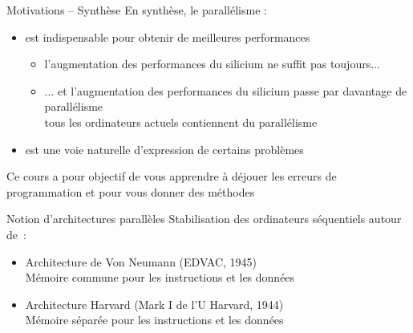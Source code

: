 \begin {frame} {Motivations -- Synthèse}
    En synthèse, le parallélisme :
    \begin {itemize}
	\item est indispensable pour obtenir de meilleures
	    performances

	    \begin {itemize}
		\item l'augmentation des performances du silicium
		    ne suffit pas toujours...

		\item ... et l'augmentation des performances du silicium
		    passe par davantage de parallélisme
		    \\
		    \implique tous les ordinateurs actuels contiennent
		    du parallélisme

	    \end {itemize}

	\item est une voie naturelle d'expression de certains problèmes

    \end {itemize}

    \vspace* {3mm}

    Ce cours a pour objectif de vous apprendre à déjouer les erreurs
    de programmation et pour vous donner des méthodes

\end {frame}



\begin {frame} {Notion d'architectures parallèles}
    Stabilisation des ordinateurs séquentiels autour de~:

    \begin {itemize}
	\item Architecture de Von Neumann (EDVAC, 1945)\\
	    Mémoire commune pour les instructions et les données
	\item Architecture Harvard (Mark I de l'U Harvard, 1944) \\
	    Mémoire séparée pour les instructions et les données
    \end {itemize}

\end {frame}

